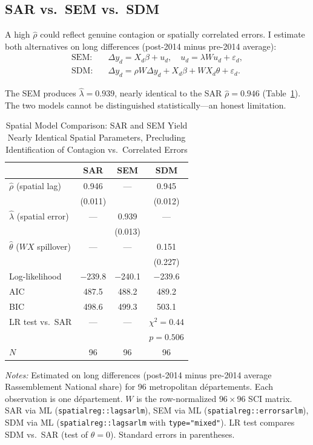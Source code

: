 \documentclass[12pt]{article}
\newcommand{\rn}{Rassemblement National}
\newcommand{\dept}{d\'{e}partement}
\newcommand{\depts}{d\'{e}partements}
\begin{document}
\subsection{SAR vs.\ SEM vs.\ SDM}
\label{sec:sar_sem}

A high $\hat{\rho}$ could reflect genuine contagion or spatially correlated errors. I estimate both alternatives on long differences (post-2014 minus pre-2014 average):
\begin{align}
\text{SEM:} \quad & \Delta y_d = X_d \beta + u_d, \quad u_d = \lambda W u_d + \varepsilon_d, \label{eq:sem} \\
\text{SDM:} \quad & \Delta y_d = \rho W \Delta y_d + X_d \beta + W X_d \theta + \varepsilon_d. \label{eq:sdm}
\end{align}

The SEM produces $\hat{\lambda} = 0.939$, nearly identical to the SAR $\hat{\rho} = 0.946$ (Table~\ref{tab:spatial}). The two models cannot be distinguished statistically---an honest limitation.

\begin{table}[H]
\centering
\caption[Spatial Model Comparison]{Spatial Model Comparison: SAR and SEM Yield Nearly Identical Spatial Parameters, Precluding Identification of Contagion vs.\ Correlated Errors}
\label{tab:spatial}
\begin{threeparttable}
\begin{tabular}{@{}lccc@{}}
\toprule
 & SAR & SEM & SDM \\
\midrule
$\hat{\rho}$ (spatial lag) & 0.946 & --- & 0.945 \\
 & (0.011) & & (0.012) \\[2pt]
$\hat{\lambda}$ (spatial error) & --- & 0.939 & --- \\
 & & (0.013) & \\[2pt]
$\hat{\theta}$ ($WX$ spillover) & --- & --- & 0.151 \\
 & & & (0.227) \\[3pt]
Log-likelihood & $-$239.8 & $-$240.1 & $-$239.6 \\
AIC & 487.5 & 488.2 & 489.2 \\
BIC & 498.6 & 499.3 & 503.1 \\[3pt]
LR test vs.\ SAR & --- & --- & $\chi^2 = 0.44$ \\
 & & & $p = 0.506$ \\[3pt]
$N$ & 96 & 96 & 96 \\
\bottomrule
\end{tabular}
\begin{tablenotes}
\small
\item \textit{Notes:} Estimated on long differences (post-2014 minus pre-2014 average \rn{} share) for 96 metropolitan \depts{}. Each observation is one \dept{}. $W$ is the row-normalized $96 \times 96$ SCI matrix. SAR via ML (\texttt{spatialreg::lagsarlm}), SEM via ML (\texttt{spatialreg::errorsarlm}), SDM via ML (\texttt{spatialreg::lagsarlm} with \texttt{type="mixed"}). LR test compares SDM vs.\ SAR (test of $\theta = 0$). Standard errors in parentheses.
\end{tablenotes}
\end{threeparttable}
\end{table}
\end{document}
